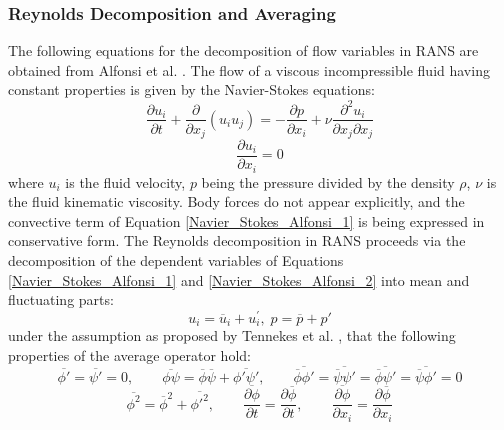 \subsubsection{Reynolds Decomposition and Averaging} The following equations for the decomposition of flow variables in RANS are obtained from Alfonsi et al. \cite{Alfonsi2009}. The flow of a viscous incompressible fluid having constant properties is given by the Navier-Stokes equations:
\begin{equation}\label{Navier_Stokes_Alfonsi_1}
	\frac{\partial u_i}{\partial t} + \frac{\partial}{\partial x_j}(u_iu_j) = -\frac{\partial p}{\partial x_i} + \nu\frac{\partial^2 u_i}{\partial x_j \partial x_j}
\end{equation}
\begin{equation}\label{Navier_Stokes_Alfonsi_2}
	\frac{\partial u_i}{\partial x_i} = 0
\end{equation}
where $u_i$ is the fluid velocity, $p$ being the pressure divided by the density $\rho$, $\nu$ is the fluid kinematic viscosity. Body forces do not appear explicitly, and the convective term of Equation \eqref{Navier_Stokes_Alfonsi_1} is being expressed in conservative form. The Reynolds decomposition in RANS proceeds via the decomposition of the dependent variables of Equations \eqref{Navier_Stokes_Alfonsi_1} and \eqref{Navier_Stokes_Alfonsi_2} into mean and fluctuating parts:
\begin{equation} \label{u_i_Alfonsi}
u_i = \overline{u}_i + u_i^\prime,\;p = \overline{p} + p\prime
\end{equation}
under the assumption as proposed by Tennekes et al. \cite{Tennekes1972}, that the following properties of the average operator hold:
\begin{equation} \label{average_operator_Alfonsi_1}
	\overline{\phi\prime} = \overline{\psi\prime} = 0,
\qquad
	\overline{\phi\psi} = \overline{\phi}\overline{\psi} + \overline{\phi\prime\psi\prime},
\qquad
	\overline{\overline{\phi}\phi\prime} = \overline{\overline{\psi}\psi\prime} = \overline{\overline{\phi}\psi\prime} = \overline{\overline{\psi}\phi\prime} = 0
\end{equation}
\begin{equation} 	\label{average_operator_Alfonsi_2}
	\overline{\phi^2} = \overline{\phi}^2 + \overline{\phi\prime^2},
	\qquad
	\frac{\overline{\partial\phi}}{\partial t} = \frac{\partial\overline{\phi}}{\partial t},
	\qquad
	\frac{\overline{\partial\phi}}{\partial x_i} = \frac{\partial\overline{\phi}}{\partial x_i}
\end{equation}

